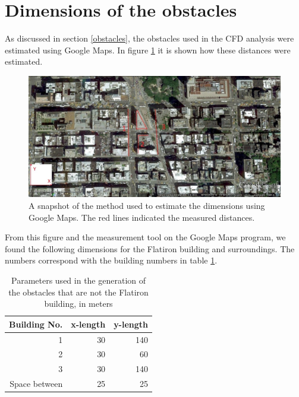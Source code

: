 \appendix
\section{Dimensions of the obstacles}
\label{appendixdimensions}
As discussed in section \ref{obstacles}, the obstacles used in the CFD analysis were estimated using Google Maps. In figure \ref{maps} it is shown how these distances were estimated. 
\begin{figure}[h!]
\centering
\includegraphics[width = \textwidth]{flatironafschatting.jpg}
\caption{A snapshot of the method used to estimate the dimensions using Google Maps. The red lines indicated the measured distances. }
\label{maps}
\end{figure}
From this figure and the measurement tool on the Google Maps program, we found the following dimensions for the Flatiron building and surroundings. The numbers correspond with the building numbers in table \ref{measurements}.\\
\begin{table}[ht!]
\centering
\caption{Parameters used in the generation of the obstacles that are not the Flatiron building, in meters}
\begin{tabular}{  r  r  r }
\hline
Building No. & x-length & y-length\\
\hline 
1 & 30 & 140 \\
2 & 30 & 60 \\
3 & 30 & 140 \\
Space between & 25 & 25 \\
\hline
\end{tabular}
\label{measurements}
\end{table}\\
%
%
